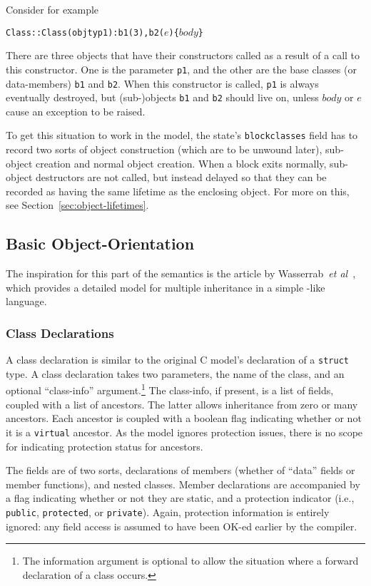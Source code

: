 \documentclass[11pt]{article}
\begin{document}
Consider for example
\begin{alltt}
  Class::Class(objty p1) : b1(3), b2(\(e\)) \{ \(\mathit{body}\) \}
\end{alltt}
There are three objects that have their constructors called as a
result of a call to this constructor.  One is the parameter
\texttt{p1}, and the other are the base classes (or data-members)
\texttt{b1} and \texttt{b2}.  When this constructor is called,
\texttt{p1} is always eventually destroyed, but (sub-)objects
\texttt{b1} and \texttt{b2} should live on, unless $\mathit{body}$ or
$e$ cause an exception to be raised.

To get this situation to work in the model, the state's
\texttt{blockclasses} field has to record two sorts of object
construction (which are to be unwound later), sub-object creation and
normal object creation.  When a block exits normally, sub-object
destructors are not called, but instead delayed so that they can be
recorded as having the same lifetime as the enclosing object.  For
more on this, see Section~\ref{sec:object-lifetimes}.

\subsection{Basic Object-Orientation}
\label{sec:basic-oo}

The inspiration for this part of the semantics is the article by
Wasserrab~\emph{et al}~\cite{wasserrab-nst-OOPSLA06}, which provides a
detailed model for multiple inheritance in a simple \cpp-like
language.

\subsubsection{Class Declarations}
\label{sec:class-declaration}
A class declaration is similar to the original C model's declaration
of a \texttt{struct} type.  A class declaration takes two parameters,
the name of the class, and an optional ``class-info''
argument.\footnote{The information argument is optional to allow the
  situation where a forward declaration of a class occurs.}  The
class-info, if present, is a list of fields, coupled with a list of
ancestors.  The latter allows inheritance from zero or many ancestors.
Each ancestor is coupled with a boolean flag indicating whether or not
it is a \texttt{virtual} ancestor.  As the model ignores protection
issues, there is no scope for indicating protection status for
ancestors.

The fields are of two sorts, declarations of members (whether of
``data'' fields or member functions), and nested classes.  Member
declarations are accompanied by a flag indicating whether or not they
are static, and a protection indicator (i.e., \texttt{public},
\texttt{protected}, or \texttt{private}).  Again, protection
information is entirely ignored: any field access is assumed to have
been OK-ed earlier by the compiler.
\end{document}
